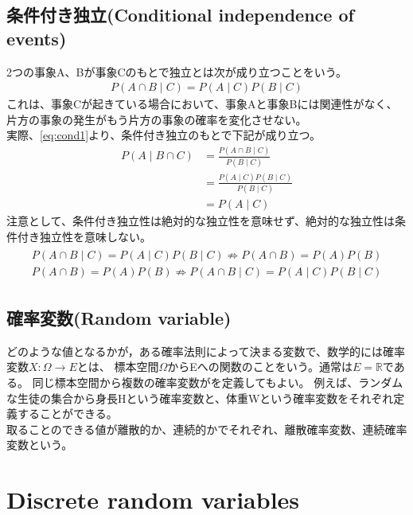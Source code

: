 \documentclass[a4j]{jarticle}
\begin{document}
\subsection{条件付き独立(Conditional independence of events)}
2つの事象A、Bが事象Cのもとで独立とは次が成り立つことをいう。
\begin{align}
    P(A \cap B \mid C) = P(A \mid C)P(B \mid C)
\end{align}
これは、事象Cが起きている場合において、事象Aと事象Bには関連性がなく、片方の事象の発生がもう片方の事象の確率を変化させない。 \\
実際、\eqref{eq:cond1}より、条件付き独立のもとで下記が成り立つ。\\
\begin{align}
    P(A \mid B \cap C) &= \frac{P(A \cap B \mid C)}{P(B \mid C)}  \\
    &= \frac{P(A \mid C)P(B \mid C)}{P(B \mid C)} \\
    &= P(A \mid C)
\end{align}
注意として、条件付き独立性は絶対的な独立性を意味せず、絶対的な独立性は条件付き独立性を意味しない。\\
\begin{align}
    \begin{aligned}
    P(A \cap B \mid C) = P(A \mid C)P(B \mid C) \nRightarrow P(A \cap B) = P(A)P(B) \\
    P(A \cap B) = P(A)P(B) \nRightarrow P(A \cap B \mid C) = P(A \mid C)P(B \mid C)
    \end{aligned}
\end{align}


\subsection{確率変数(Random variable)}
どのような値となるかが，ある確率法則によって決まる変数で、数学的には確率変数$X:\Omega \rightarrow E$とは、
標本空間$\Omega$からEへの関数のことをいう。通常は$E=\mathbb{R}$である。
同じ標本空間から複数の確率変数がを定義してもよい。
例えば、ランダムな生徒の集合から身長Hという確率変数と、体重Wという確率変数をそれぞれ定義することができる。\\
取ることのできる値が離散的か、連続的かでそれぞれ、離散確率変数、連続確率変数という。

\section{Discrete random variables}
\end{document}
